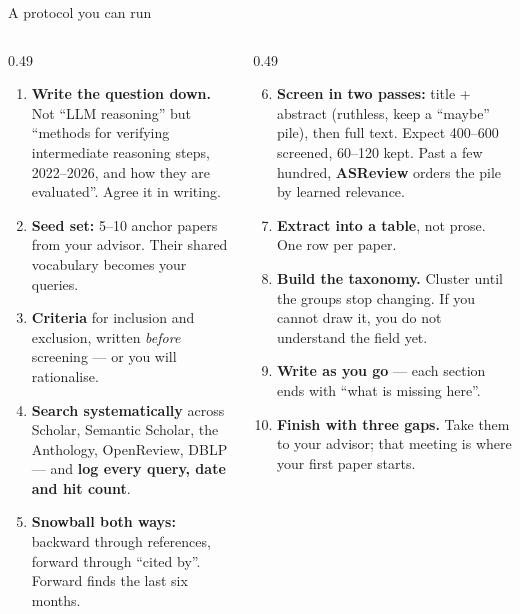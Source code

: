 \documentclass[aspectratio=169,11pt]{beamer}
\newcommand{\key}[1]{\textbf{\color{brand}#1}}
\begin{document}
\begin{frame}{A protocol you can run}
\begin{columns}[T]
\begin{column}{0.49\textwidth}
\footnotesize
\begin{enumerate}
  \item \key{Write the question down.} Not ``LLM reasoning'' but ``methods for
        verifying intermediate reasoning steps, 2022--2026, and how they are
        evaluated''. Agree it in writing.
  \item \key{Seed set:} 5--10 anchor papers from your advisor. Their shared
        vocabulary becomes your queries.
  \item \key{Criteria} for inclusion and exclusion, written \emph{before}
        screening --- or you will rationalise.
  \item \key{Search systematically} across Scholar, Semantic Scholar, the
        Anthology, OpenReview, DBLP --- and \key{log every query, date and hit
        count}.
  \item \key{Snowball both ways:} backward through references, forward through
        ``cited by''. Forward finds the last six months.
\end{enumerate}
\end{column}
\begin{column}{0.49\textwidth}
\footnotesize
\begin{enumerate}\setcounter{enumi}{5}
  \item \key{Screen in two passes:} title + abstract (ruthless, keep a
        ``maybe'' pile), then full text. Expect 400--600 screened, 60--120
        kept. Past a few hundred, \key{ASReview} orders the pile by learned
        relevance.
  \item \key{Extract into a table}, not prose. One row per paper.
  \item \key{Build the taxonomy.} Cluster until the groups stop changing. If
        you cannot draw it, you do not understand the field yet.
  \item \key{Write as you go} --- each section ends with ``what is missing
        here''.
  \item \key{Finish with three gaps.} Take them to your advisor; that meeting
        is where your first paper starts.
\end{enumerate}
\end{column}
\end{columns}
\end{frame}
\end{document}
